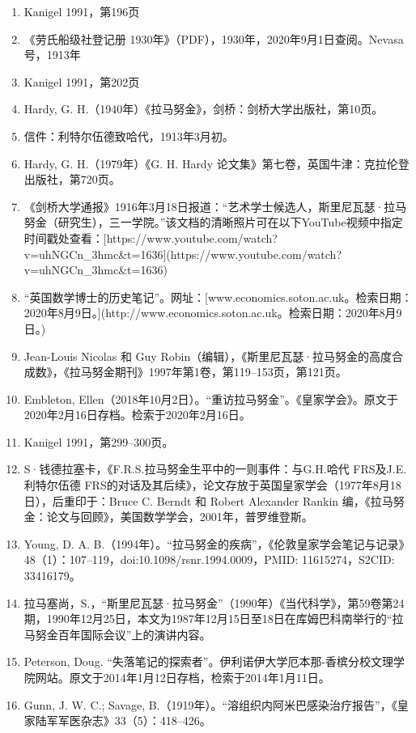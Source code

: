 \begin{enumerate}
\item Kanigel 1991，第196页
\item 《劳氏船级社登记册 1930年》（PDF），1930年，2020年9月1日查阅。Nevasa号，1913年
\item Kanigel 1991，第202页
\item Hardy, G. H.（1940年）《拉马努金》，剑桥：剑桥大学出版社，第10页。
\item 信件：利特尔伍德致哈代，1913年3月初。
\item Hardy, G. H.（1979年）《G. H. Hardy 论文集》第七卷，英国牛津：克拉伦登出版社，第720页。
\item 《剑桥大学通报》1916年3月18日报道：“艺术学士候选人，斯里尼瓦瑟·拉马努金（研究生），三一学院。”该文档的清晰照片可在以下YouTube视频中指定时间戳处查看：[https://www.youtube.com/watch?v=uhNGCn\_3hmc\&t=1636](https://www.youtube.com/watch?v=uhNGCn_3hmc&t=1636)
\item “英国数学博士的历史笔记”。网址：[www.economics.soton.ac.uk。检索日期：2020年8月9日。](http://www.economics.soton.ac.uk。检索日期：2020年8月9日。)
\item Jean-Louis Nicolas 和 Guy Robin（编辑），《斯里尼瓦瑟·拉马努金的高度合成数》，《拉马努金期刊》1997年第1卷，第119–153页，第121页。
\item Embleton, Ellen（2018年10月2日）。“重访拉马努金”。《皇家学会》。原文于2020年2月16日存档。检索于2020年2月16日。
\item Kanigel 1991，第299–300页。
\item S·钱德拉塞卡，《F.R.S.拉马努金生平中的一则事件：与G.H.哈代 FRS及J.E.利特尔伍德 FRS的对话及其后续》，论文存放于英国皇家学会（1977年8月18日），后重印于：Bruce C. Berndt 和 Robert Alexander Rankin 编，《拉马努金：论文与回顾》，美国数学学会，2001年，普罗维登斯。
\item Young, D. A. B.（1994年）。“拉马努金的疾病”，《伦敦皇家学会笔记与记录》48（1）：107–119，doi:10.1098/rsnr.1994.0009，PMID: 11615274，S2CID: 33416179。
\item 拉马塞尚，S.，“斯里尼瓦瑟·拉马努金”（1990年）《当代科学》，第59卷第24期，1990年12月25日，本文为1987年12月15日至18日在库姆巴科南举行的“拉马努金百年国际会议”上的演讲内容。
\item Peterson, Doug. “失落笔记的探索者”。伊利诺伊大学厄本那-香槟分校文理学院网站。原文于2014年1月12日存档，检索于2014年1月11日。
\item Gunn, J. W. C.; Savage, B.（1919年）。“溶组织内阿米巴感染治疗报告”，《皇家陆军军医杂志》33（5）：418–426。
\end{enumerate}
